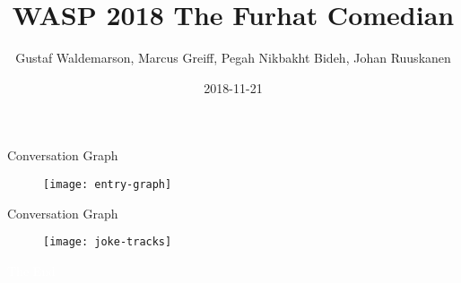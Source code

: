 \documentclass{beamer}
\title{WASP 2018 The Furhat Comedian}
\date{2018-11-21}
\author{Gustaf Waldemarson, Marcus Greiff, Pegah Nikbakht Bideh, Johan Ruuskanen}
\begin{document}
\begin{frame}
  \titlepage
\end{frame}


\begin{frame}{Conversation Graph}
  \begin{figure}[ht]
    \texttt{[image: entry-graph]}
  \end{figure}
\end{frame}


\begin{frame}{Conversation Graph}
  \begin{figure}[ht]
    \texttt{[image: joke-tracks]}
  \end{figure}
\end{frame}


\bgroup
{}
\begin{frame}[t,plain]{}{}
  \begin{center}
    {\tiny \textcolor{white}{The End}}
  \end{center}
\end{frame}
\egroup
\end{document}
